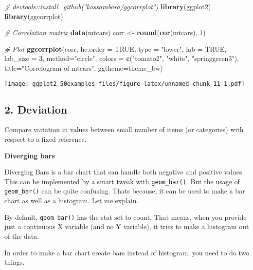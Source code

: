 \documentclass[a4paper]{article}
\newenvironment{Shaded}{\begin{snugshade}}{\end{snugshade}}
\newcommand{\KeywordTok}[1]{\textcolor[rgb]{0.13,0.29,0.53}{\textbf{#1}}}
\newcommand{\DataTypeTok}[1]{\textcolor[rgb]{0.13,0.29,0.53}{#1}}
\newcommand{\DecValTok}[1]{\textcolor[rgb]{0.00,0.00,0.81}{#1}}
\newcommand{\StringTok}[1]{\textcolor[rgb]{0.31,0.60,0.02}{#1}}
\newcommand{\CommentTok}[1]{\textcolor[rgb]{0.56,0.35,0.01}{\textit{#1}}}
\newcommand{\OtherTok}[1]{\textcolor[rgb]{0.56,0.35,0.01}{#1}}
\newcommand{\NormalTok}[1]{#1}
\begin{document}
\begin{Shaded}
\begin{Highlighting}[]
\CommentTok{# devtools::install_github("kassambara/ggcorrplot")}
\KeywordTok{library}\NormalTok{(ggplot2)}
\KeywordTok{library}\NormalTok{(ggcorrplot)}

\CommentTok{# Correlation matrix}
\KeywordTok{data}\NormalTok{(mtcars)}
\NormalTok{corr <-}\StringTok{ }\KeywordTok{round}\NormalTok{(}\KeywordTok{cor}\NormalTok{(mtcars), }\DecValTok{1}\NormalTok{)}

\CommentTok{# Plot}
\KeywordTok{ggcorrplot}\NormalTok{(corr, }\DataTypeTok{hc.order =} \OtherTok{TRUE}\NormalTok{, }
           \DataTypeTok{type =} \StringTok{"lower"}\NormalTok{, }
           \DataTypeTok{lab =} \OtherTok{TRUE}\NormalTok{, }
           \DataTypeTok{lab_size =} \DecValTok{3}\NormalTok{, }
           \DataTypeTok{method=}\StringTok{"circle"}\NormalTok{, }
           \DataTypeTok{colors =} \KeywordTok{c}\NormalTok{(}\StringTok{"tomato2"}\NormalTok{, }\StringTok{"white"}\NormalTok{, }\StringTok{"springgreen3"}\NormalTok{), }
           \DataTypeTok{title=}\StringTok{"Correlogram of mtcars"}\NormalTok{, }
           \DataTypeTok{ggtheme=}\NormalTok{theme_bw)}
\end{Highlighting}
\end{Shaded}

\texttt{[image: ggplot2-50examples\_files/figure-latex/unnamed-chunk-11-1.pdf]}
\newpage

\subsection{2. Deviation}\label{deviation}

Compare variation in values between small number of items (or
categories) with respect to a fixed reference.

\textbf{Diverging bars}

Diverging Bars is a bar chart that can handle both negative and positive
values. This can be implemented by a smart tweak with
\texttt{geom\_bar()}. But the usage of \texttt{geom\_bar()} can be quite
confusing. Thats because, it can be used to make a bar chart as well as
a histogram. Let me explain.

By default, \texttt{geom\_bar()} has the stat set to count. That means,
when you provide just a continuous X variable (and no Y variable), it
tries to make a histogram out of the data.

In order to make a bar chart create bars instead of histogram, you need
to do two things.
\end{document}
